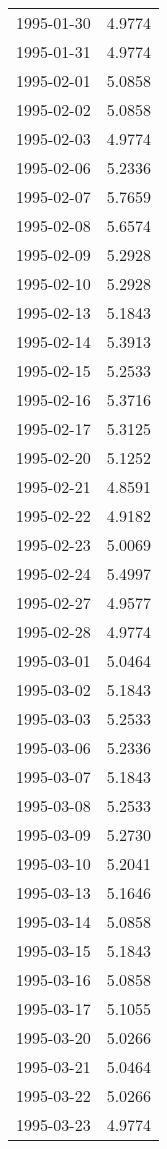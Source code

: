 \begin{tabular}{lr}
1995-01-30 &      4.9774 \\
1995-01-31 &      4.9774 \\
1995-02-01 &      5.0858 \\
1995-02-02 &      5.0858 \\
1995-02-03 &      4.9774 \\
1995-02-06 &      5.2336 \\
1995-02-07 &      5.7659 \\
1995-02-08 &      5.6574 \\
1995-02-09 &      5.2928 \\
1995-02-10 &      5.2928 \\
1995-02-13 &      5.1843 \\
1995-02-14 &      5.3913 \\
1995-02-15 &      5.2533 \\
1995-02-16 &      5.3716 \\
1995-02-17 &      5.3125 \\
1995-02-20 &      5.1252 \\
1995-02-21 &      4.8591 \\
1995-02-22 &      4.9182 \\
1995-02-23 &      5.0069 \\
1995-02-24 &      5.4997 \\
1995-02-27 &      4.9577 \\
1995-02-28 &      4.9774 \\
1995-03-01 &      5.0464 \\
1995-03-02 &      5.1843 \\
1995-03-03 &      5.2533 \\
1995-03-06 &      5.2336 \\
1995-03-07 &      5.1843 \\
1995-03-08 &      5.2533 \\
1995-03-09 &      5.2730 \\
1995-03-10 &      5.2041 \\
1995-03-13 &      5.1646 \\
1995-03-14 &      5.0858 \\
1995-03-15 &      5.1843 \\
1995-03-16 &      5.0858 \\
1995-03-17 &      5.1055 \\
1995-03-20 &      5.0266 \\
1995-03-21 &      5.0464 \\
1995-03-22 &      5.0266 \\
1995-03-23 &      4.9774 \\

\end{tabular}
